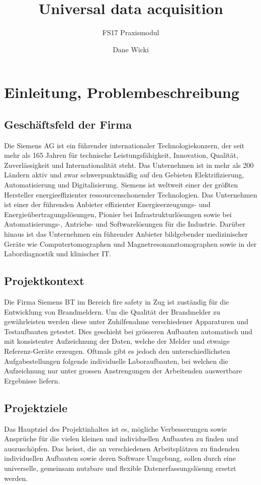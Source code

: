 \documentclass[10pt]{scrartcl}
\author{Dane Wicki}
\title{Universal data acquisition}
\subtitle{FS17 Praxismodul}
\begin{document}
\maketitle
\tableofcontents
\section{Einleitung, Problembeschreibung}
\subsection{Geschäftsfeld der Firma}
Die Siemens AG ist ein führender internationaler Technologiekonzern, der seit mehr als 165 Jahren für technische Leistungsfähigkeit, Innovation, Qualität, Zuverlässigkeit und Internationalität steht. Das Unternehmen ist in mehr als 200 Ländern aktiv und zwar schwerpunktmäßig auf den Gebieten Elektrifizierung, Automatisierung und Digitalisierung. Siemens ist weltweit einer der größten Hersteller energieeffizienter ressourcenschonender Technologien. Das Unternehmen ist einer der führenden Anbie\-ter effizienter Energieerzeugungs- und Energieübertragungslösungen, Pionier bei Infrastrukturlösungen sowie bei Automatisierungs-, Antriebs- und Softwarelösungen für die Industrie. Darüber hinaus ist das Unternehmen ein führender Anbieter bildgebender medizinischer Geräte wie Computertomographen und Magnetresonanztomographen sowie in der Labordiagnostik und klinischer IT.  
\subsection{Projektkontext}
Die Firma Siemens BT im Bereich fire safety in Zug ist zuständig für die Entwicklung von Brandmeldern.
Um die Qualität der Brandmelder zu gewährleisten werden diese unter Zuhilfenahme verschiedener Apparaturen und Testaufbauten getestet. Dies geschieht bei grösseren Aufbauten automatisch und mit konsistenter Aufzeichnung der Daten, welche der Melder und etwaige Referenz-Geräte erzeugen. Oftmals gibt es jedoch den unterschiedlichsten Aufgabestellungen folgende individuelle Laboraufbauten, bei welchen die Aufzeichnung nur unter grossen Anstrengungen der Arbeitenden auswertbare Ergebnisse liefern.

\subsection{Projektziele}
Das Hauptziel des Projektinhaltes ist es, mögliche Verbesserungen sowie Ansprüche für die vielen kleinen und individuellen Aufbauten zu finden und auszuschöpfen. Das heisst, die an verschiedenen Arbeitsplätzen zu findenden individuellen Aufbauten sowie deren Software Umgebung, sollen durch eine universelle, gemeinsam nutzbare und flexible Datenerfassungslösung ersetzt werden.
\end{document}
